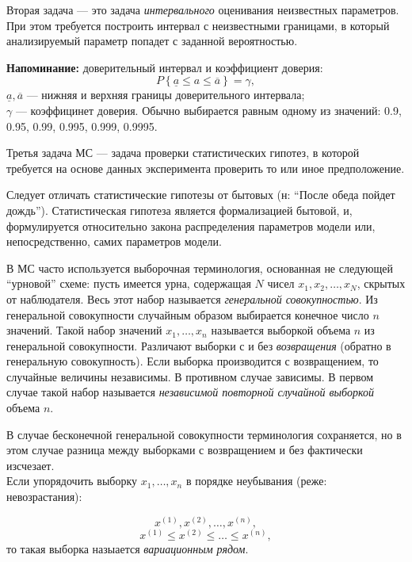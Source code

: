 \documentclass[12pt]{article}
\begin{document}
Вторая задача --- это задача \emph{интервального} оценивания неизвестных параметров. При этом требуется построить интервал с неизвестными границами, в который анализируемый параметр попадет с заданной вероятностью.  

\begin{framed}
    \textbf{Напоминание:} доверительный интервал и коэффициент доверия:
    \[ P \left\{ \underline{a} \leq a \leq \overline{a} \right\} = \gamma, \]
    $\underline{a}, \overline{a}$ --- нижняя и верхняя границы доверительного интервала;\\
    $\gamma$ --- коэффицинет доверия. Обычно выбирается равным одному из значений: 0.9, 0.95, 0.99, 0.995, 0.999, 0.9995.
\end{framed}

Третья задача МС --- задача проверки статистических гипотез, в которой требуется на основе данных эксперимента проверить то или иное предположение.

Следует отличать статистические гипотезы от бытовых (н: \enquote{После обеда пойдет дождь}). Статистическая гипотеза является формализацией бытовой, и, формулируется относительно закона распределения параметров модели или, непосредственно, самих параметров модели.

В МС часто используется выборочная терминология, основанная не следующей \enquote{урновой} схеме: пусть имеется урна, содержащая $N$ чисел $x_1, x_2, \ldots, x_N$, скрытых от наблюдателя. Весь этот набор называется \emph{генеральной совокупностью}. Из генеральной совокупности случайным образом выбирается конечное число $n$ значений. Такой набор значений $x_1, \ldots, x_n$ называется выборкой объема $n$ из генеральной совокупности. Различают выборки с и без \emph{возвращения} (обратно в генеральную совокупность). Если выборка производится с возвращением, то случайные величины независимы. В противном случае зависимы. В первом случае такой набор называется \emph{независимой повторной случайной выборкой} объема $n$.

В случае бесконечной генеральной совокупности терминология сохраняется, но в этом случае разница между выборками с возвращением и без фактически изсчезает.\\

Если упорядочить выборку $x_1, \ldots, x_n$ в порядке неубывания (реже: невозрастания):

\[ x^{(1)}, x^{(2)}, \ldots, x^{(n)}, \]
\[ x^{(1)} \leq x^{(2)} \leq \ldots \leq x^{(n)}, \]
то такая выборка назыается \emph{вариационным рядом}.
\end{document}
